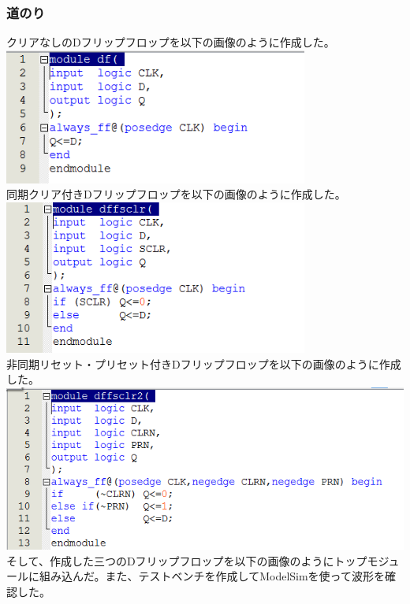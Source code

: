 \documentclass[a4paper]{jarticle}
\begin{document}
\subsubsection{道のり}
クリアなしのDフリップフロップを以下の画像のように作成した。\\
\includegraphics[width=10cm]{work13/13-2.PNG}\\
同期クリア付きDフリップフロップを以下の画像のように作成した。\\
\includegraphics[width=10cm]{work13/13-3.PNG}\\
非同期リセット・プリセット付きDフリップフロップを以下の画像のように作成した。\\
\includegraphics[width=15cm]{work13/13-4.PNG}\\
そして、作成した三つのDフリップフロップを以下の画像のようにトップモジュールに組み込んだ。また、テストベンチを作成してModelSimを使って波形を確認した。
\end{document}
